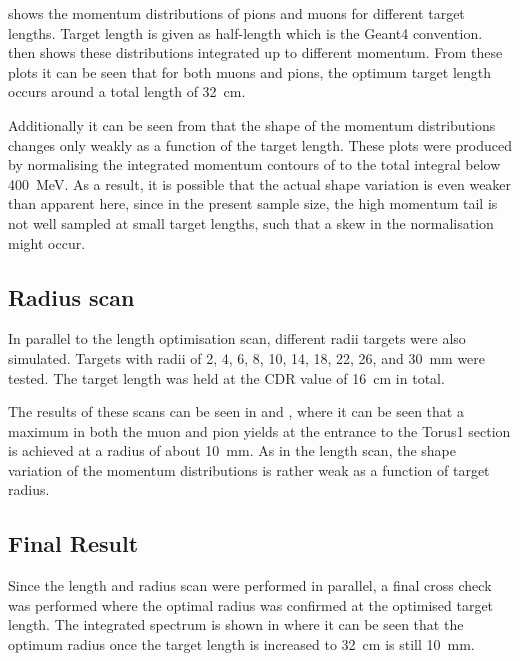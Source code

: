  shows the momentum distributions of pions and muons for different target lengths.
Target length is given as half-length which is the Geant4 convention.  
 then shows these distributions integrated up to different momentum.
From these plots it can be seen that for both muons and pions, the optimum target length occurs around a total length of 32~cm.

Additionally it can be seen from
 that the shape of the
momentum distributions changes only weakly as a function of the target length.
These plots were produced by normalising the integrated momentum contours of
 to the total integral below
400~MeV.  As a result, it is possible that the actual shape variation is even
weaker than apparent here, since in the present sample size, the high momentum
tail is not well sampled at small target lengths, such that a skew in the
normalisation might occur.

\FigOptimProdTgtLength

\subsection{Radius scan}
In parallel to the length optimisation scan, different radii targets were also simulated.
Targets with radii of 2, 4, 6, 8, 10, 14, 18, 22, 26, and 30~mm were tested.
The target length was held at the \ac{CDR} value of 16~cm in total.

The results of these scans can be seen in  and ,
where it can be seen that a maximum in both the muon and pion yields at the entrance to the Torus1 section is achieved at a radius of about 10~mm.
As in the length scan, the shape variation of the momentum distributions is rather weak as a function of target radius.

\FigOptimProdTgtRad

\subsection{Final Result}
Since the length and radius scan were performed in parallel, a final cross check was performed where the optimal radius was confirmed at the optimised target length.
The integrated spectrum is shown in  where it can be seen that the optimum radius once the target length is increased to 32~cm is still 10~mm.

